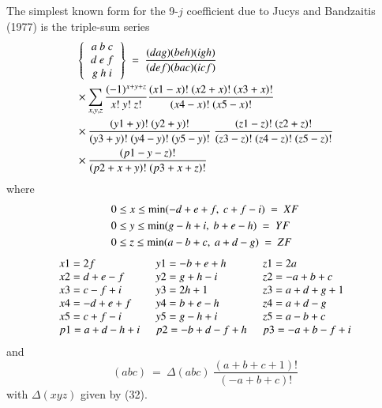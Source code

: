 The simplest known form for the 9-$j$ coefficient due to Jucys and Bandzaitis (1977) is the triple-sum series
\begin{equation}
\begin{split}
& \left\{
\begin{tabular}{c}
$a \ b \ c$\\   
$d \ e\ f$\\ 
$g \ h \ i$\\ 
\end{tabular} 
\right\} \
=\ \frac{(dag)(beh)(igh)}{(def)(bac)(icf)}\\
& \times \sum_{x,y,z} \frac{(-1)^{x+y+z}}{x!\ y!\ z!} \frac{(x1-x)!\ (x2+x)!\ (x3+x)!}
{(x4-x)!\ (x5-x)!}\\
& \times\frac{(y1+y)!\ (y2+y)!}{(y3+y)!\ (y4-y)!\ (y5-y)!} \ \frac{(z1-z)!\ (z2+z)!}{(z3-z)!\ (z4-z)!\ (z5-z)!}\\
& \times \frac{(p1-y-z)!}{(p2+x+y)!\ (p3+x+z)!} \label{chap7-eq54}
\end{split}
\end{equation}
where
\begin{equation}
\begin{split}
& 0 \leq x \leq {\rm min} (-d+e+f,\ c+f-i)\ =\ XF \\
& 0 \leq y \leq {\rm min} ( g-h+i,\ b+e-h)\ =\ YF \\
& 0 \leq z \leq {\rm min} ( a-b+c,\ a+d-g)\ =\ ZF \label{chap7-eq55}
\end{split}
\end{equation}
\begin{equation}
\begin{tabular}{lll}
$x1=2f$ &\ $y1=-b+e+h$ &\ $z1=2a$ \\
$x2=d+e-f$ &\ $y2=g+h-i$ &\ $z2=-a+b+c$ \\
$x3=c-f+i$ &\ $y3=2h+1$ &\ $z3=a+d+g+1$\\
$x4=-d+e+f$ &\ $y4=b+e-h$ &\ $z4=a+d-g$ \\
$x5=c+f-i$ &\ $y5=g-h+i$ &\ $z5=a-b+c$ \\
$p1=a+d-h+i$ &\ $p2=-b+d-f+h$ &\ $p3=-a+b-f+i$\label{chap7-eq56}
\end{tabular}
\end{equation}
and 
\begin{equation}
(abc)\ =\ \Delta(abc)\ \frac{(a+b+c+1)!}{(-a+b+ c)!}\label{chap7-eq57}
\end{equation}
with $\Delta(xyz)$ given by (32).

